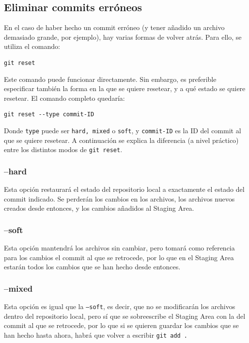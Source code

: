 \documentclass[
twoside,
12pt,                   
]{article}
\begin{document}
\subsection{Eliminar commits erróneos}
En el caso de haber hecho un commit erróneo (y tener añadido un archivo demasiado grande, por ejemplo), hay varias formas de volver atrás. Para ello, se utiliza el comando:
\begin{lstlisting}[style=powershell]
    git reset
\end{lstlisting}
Este comando puede funcionar directamente. Sin embargo, es preferible especificar también la forma en la que se quiere resetear, y a qué estado se quiere resetear. El comando completo quedaría:
\begin{lstlisting}[style=powershell]
    git reset --type commit-ID
\end{lstlisting}
Donde \texttt{type} puede ser \texttt{hard, mixed} o \texttt{soft}, y \texttt{commit-ID} es la ID del commit al que se quiere resetear. A continuación se explica la diferencia (a nivel práctico) entre los distintos modos de \texttt{git reset}.

\subsubsection{--hard}
Esta opción restaurará el estado del repositorio local a exactamente el estado del commit indicado. Se perderán los cambios en los archivos, los archivos nuevos creados desde entonces, y los cambios añadidos al Staging Area.

\subsubsection{--soft}
Esta opción mantendrá los archivos sin cambiar, pero tomará como referencia para los cambios el commit al que se retrocede, por lo que en el Staging Area estarán todos los cambios que se han hecho desde entonces.

\subsubsection{--mixed}
Esta opción es igual que la \texttt{--soft}, es decir, que no se modificarán los archivos dentro del repositorio local, pero sí que se sobreescribe el Staging Area con la del commit al que se retrocede, por lo que si se quieren guardar los cambios que se han hecho hasta ahora, habrá que volver a escribir \texttt{git add .}
\end{document}
